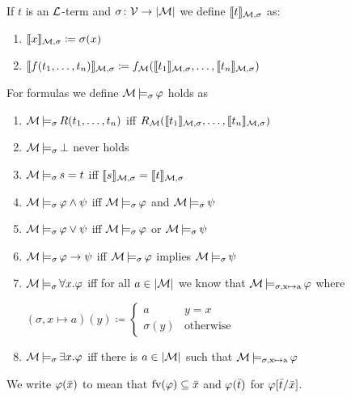 \begin{boxdef}
\begin{defi}
    If $t$ is an $\mathcal{L}$-term and $\sigma \colon \mathcal{V} \to \lvert \mathcal{M} \rvert$ we define \alert{$\llbracket t \rrbracket_{\mathcal{M}, \sigma}$} as: 
    \begin{enumerate}
        \item $\llbracket x \rrbracket_{\mathcal{M}, \sigma} \coloneq \sigma(x)$
        \item $\llbracket f(t_1, \dots, t_n) \rrbracket_{\mathcal{M}, \sigma} \coloneq f_{\mathcal{M}}(\llbracket t_1 \rrbracket_{\mathcal{M}, \sigma}, \dots, \llbracket t_n \rrbracket_{\mathcal{M}, \sigma})$
    \end{enumerate}
    For formulas we define \alert{$\mathcal{M} \operatorname{\models_{\sigma}} \varphi$} holds as 
    \begin{enumerate}
        \item $\mathcal{M} \operatorname{\models_{\sigma}} R(t_1, \dots, t_n)$ iff $R_{\mathcal{M}}(\llbracket t_1 \rrbracket_{\mathcal{M}, \sigma}, \dots, \llbracket t_n \rrbracket_{\mathcal{M}, \sigma})$
        \item $\mathcal{M} \operatorname{\models_{\sigma}} \bot$ never holds
        \item $\mathcal{M} \operatorname{\models_{\sigma}} s = t$ iff $\llbracket s \rrbracket_{\mathcal{M}, \sigma} = \llbracket t \rrbracket_{\mathcal{M}, \sigma}$
        \item $\mathcal{M} \operatorname{\models_{\sigma}} \varphi \wedge \psi$ iff $\mathcal{M} \operatorname{\models_{\sigma}} \varphi$ and $\mathcal{M} \operatorname{\models_{\sigma}} \psi$
        \item $\mathcal{M} \operatorname{\models_{\sigma}} \varphi \lor \psi$ iff $\mathcal{M} \operatorname{\models_{\sigma}} \varphi$ or $\mathcal{M} \operatorname{\models_{\sigma}} \psi$
        \item $\mathcal{M} \operatorname{\models_{\sigma}} \varphi \to \psi$ iff $\mathcal{M} \operatorname{\models_{\sigma}} \varphi$ implies $\mathcal{M} \operatorname{\models_{\sigma}} \psi$
        \item $\mathcal{M} \operatorname{\models_{\sigma}} \forall x. \varphi$ iff for all $a \in \lvert \mathcal{M} \rvert$ we know that $\mathcal{M} \operatorname{\models_{\sigma, x \mapsto a}} \varphi$ where 
        
        $(\sigma, x \mapsto a)(y) \coloneq
        \begin{cases}
            a & y = x \\
            \sigma(y) & \text{otherwise}
        \end{cases}$
        \item $\mathcal{M} \operatorname{\models_{\sigma}} \exists x. \varphi$ iff there is $a \in \lvert \mathcal{M} \rvert$ such that $\mathcal{M} \operatorname{\models_{\sigma, x \mapsto a}} \varphi$
    \end{enumerate}
\end{defi}
\end{boxdef}

\begin{rem}
    We write \alert{$\varphi(\bar{x})$} to mean that $\text{fv}(\varphi) \subseteq \bar{x}$ and \alert{$\varphi(\bar{t})$} for $\varphi[\bar{t}/\bar{x}]$.
\end{rem}


